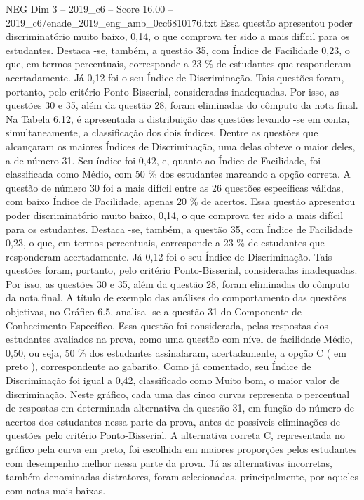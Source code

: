 \begin{textsample}{NEG Dim 3 – 2019\_c6 – Score 16.00 – 2019\_c6/enade\_2019\_eng\_amb\_0cc6810176.txt}
Essa questão apresentou poder discriminatório muito baixo, 0,14, o que comprova ter sido a mais difícil para os estudantes.
Destaca -se, também, a questão 35, com Índice de Facilidade 0,23, o que, em termos percentuais, corresponde a 23 \% de estudantes que responderam acertadamente.
Já 0,12 foi o seu Índice de Discriminação.
Tais questões foram, portanto, pelo critério Ponto-Bisserial, consideradas inadequadas.
Por isso, as questões 30 e 35, além da questão 28, foram eliminadas do cômputo da nota final.
Na Tabela 6.12, é apresentada a distribuição das questões levando -se em conta, simultaneamente, a classificação dos dois índices.
Dentre as questões que alcançaram os maiores Índices de Discriminação, uma delas obteve o maior deles, a de número 31.
Seu índice foi 0,42, e, quanto ao Índice de Facilidade, foi classificada como Médio, com 50 \% dos estudantes marcando a opção correta.
A questão de número 30 foi a mais difícil entre as 26 questões específicas válidas, com baixo Índice de Facilidade, apenas 20 \% de acertos.
Essa questão apresentou poder discriminatório muito baixo, 0,14, o que comprova ter sido a mais difícil para os estudantes.
Destaca -se, também, a questão 35, com Índice de Facilidade 0,23, o que, em termos percentuais, corresponde a 23 \% de estudantes que responderam acertadamente.
Já 0,12 foi o seu Índice de Discriminação.
Tais questões foram, portanto, pelo critério Ponto-Bisserial, consideradas inadequadas.
Por isso, as questões 30 e 35, além da questão 28, foram eliminadas do cômputo da nota final.
A título de exemplo das análises do comportamento das questões objetivas, no Gráfico 6.5, analisa -se a questão 31 do Componente de Conhecimento Específico.
Essa questão foi considerada, pelas respostas dos estudantes avaliados na prova, como uma questão com nível de facilidade Médio, 0,50, ou seja, 50 \% dos estudantes assinalaram, acertadamente, a opção C ( em preto ), correspondente ao gabarito.
Como já comentado, seu Índice de Discriminação foi igual a 0,42, classificado como Muito bom, o maior valor de discriminação.
Neste gráfico, cada uma das cinco curvas representa o percentual de respostas em determinada alternativa da questão 31, em função do número de acertos dos estudantes nessa parte da prova, antes de possíveis eliminações de questões pelo critério Ponto-Bisserial.
A alternativa correta C, representada no gráfico pela curva em preto, foi escolhida em maiores proporções pelos estudantes com desempenho melhor nessa parte da prova.
Já as alternativas incorretas, também denominadas distratores, foram selecionadas, principalmente, por aqueles com notas mais baixas.

\end{textsample}
